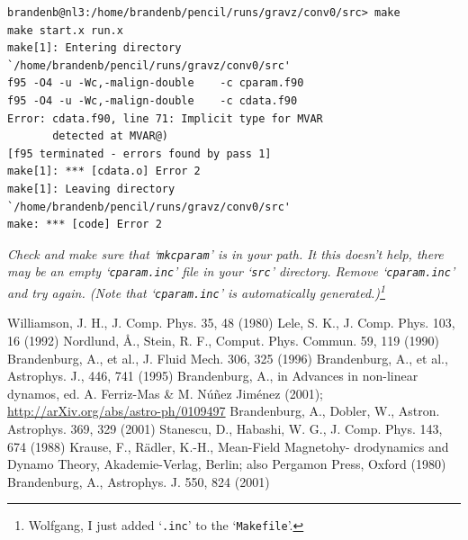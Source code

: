 \documentclass[12pt,twoside,notitlepage,a4paper]{article}
\newcommand{\file}[1]{`\texttt{#1}'}
\begin{document}
\begin{description}
{    \begin{Verbatim}
brandenb@nl3:/home/brandenb/pencil/runs/gravz/conv0/src> make
make start.x run.x
make[1]: Entering directory `/home/brandenb/pencil/runs/gravz/conv0/src'
f95 -O4 -u -Wc,-malign-double    -c cparam.f90
f95 -O4 -u -Wc,-malign-double    -c cdata.f90
Error: cdata.f90, line 71: Implicit type for MVAR
       detected at MVAR@)
[f95 terminated - errors found by pass 1]
make[1]: *** [cdata.o] Error 2
make[1]: Leaving directory `/home/brandenb/pencil/runs/gravz/conv0/src'
make: *** [code] Error 2
    \end{Verbatim}
    }
    \medskip

    {\em
Check and make sure that \file{mkcparam} is in your path.
It this doesn't help, there may be an {\it empty} \file{cparam.inc}
file in your \file{src} directory. Remove \file{cparam.inc} and try again.
(Note that \file{cparam.inc} is automatically generated.)\footnote{Wolfgang,
I just added \file{\rm *.inc} to the \file{Makefile}.}
    }

\end{description}



\begin{thebibliography}{9}

 Williamson, J. H., J. Comp. Phys. 35, 48 (1980)
 Lele, S. K., J. Comp. Phys. 103, 16 (1992)
 Nordlund, \AA., Stein, R. F., Comput. Phys. Commun. 59, 119 (1990)
 Brandenburg, A., et al., J. Fluid Mech. 306, 325 (1996)
 Brandenburg, A., et al., Astrophys. J., 446, 741 (1995)
 Brandenburg, A., in Advances in non-linear dynamos,
ed. A. Ferriz-Mas \& M. N\'u\~nez Jim\'enez (2001);
\url{http://arXiv.org/abs/astro-ph/0109497}
 Brandenburg, A., Dobler, W., Astron. Astrophys. 369, 329 (2001)
 Stanescu, D., Habashi, W. G., J. Comp. Phys. 143, 674 (1988)
 Krause, F., R\"adler, K.-H., Mean-Field
Magneto\-hy- dro\-dy\-na\-mics and Dynamo Theory,
Akademie-Verlag, Berlin; also Pergamon Press, Oxford (1980)
 Brandenburg, A., Astrophys. J. 550, 824 (2001)

\end{thebibliography}



\end{document}
